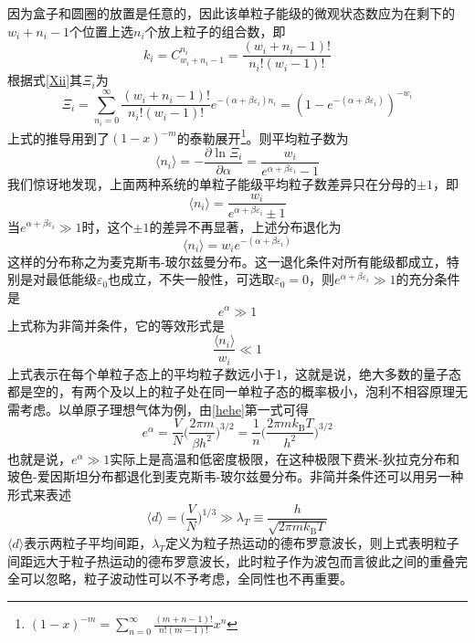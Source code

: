 \documentclass[UTF8,oneside,openany]{ctexbook}
\newcommand\aver[1]{\langle#1\rangle}
\newcommand\kb{k_{\text{B}}}
\begin{document}
因为盒子和圆圈的放置是任意的，因此该单粒子能级的微观状态数应为在剩下的$w_i+n_i-1$个位置上选$n_i$个放上粒子的组合数，即
\begin{equation}
k_i=C_{w_i+n_i-1}^{n_i}=\frac{(w_i+n_i-1)!}{n_i!(w_i-1)!}
\end{equation}
根据式\ref{Xii}其$\Xi_i$为
\begin{equation}
\Xi_i=\sum_{n_i=0}^{\infty}\frac{(w_i+n_i-1)!}{n_i!(w_i-1)!}e^{-(\alpha+\beta\varepsilon_i)n_i}=(1-e^{-(\alpha+\beta\varepsilon_i)})^{-w_i}
\end{equation}
上式的推导用到了$(1-x)^{-m}$的泰勒展开\footnote{$(1-x)^{-m}=\sum_{n=0}^{\infty}\frac{(m+n-1)!}{n!(m-1)!}x^n$}。则平均粒子数为
\begin{equation}\label{bs}
\aver{n_i}=-\frac{\partial\ln\Xi_i}{\partial\alpha}=\frac{w_i}{e^{\alpha+\beta\varepsilon_i}-1}
\end{equation}
我们惊讶地发现，上面两种系统的单粒子能级平均粒子数差异只在分母的$\pm1$，即
\begin{equation}
\aver{n_i}=\frac{w_i}{e^{\alpha+\beta\varepsilon_i}\pm1}
\end{equation}
当$e^{\alpha+\beta\varepsilon_i}\gg1$时，这个$\pm1$的差异不再显著，上述分布退化为
\begin{equation}
\aver{n_i}=w_ie^{-(\alpha+\beta\varepsilon_i)}
\end{equation}
这样的分布称之为麦克斯韦-玻尔兹曼分布。这一退化条件对所有能级都成立，特别是对最低能级$\varepsilon_0$也成立，不失一般性，可选取$\varepsilon_0=0$，则$e^{\alpha+\beta\varepsilon_i}\gg1$的充分条件是
\begin{equation}
e^{\alpha}\gg1
\end{equation}
上式称为非简并条件，它的等效形式是
\begin{equation}
\frac{\aver{n_i}}{w_i}\ll1
\end{equation}
上式表示在每个单粒子态上的平均粒子数远小于1，这就是说，绝大多数的量子态都是空的，有两个及以上的粒子处在同一单粒子态的概率极小，泡利不相容原理无需考虑。以单原子理想气体为例，由\ref{hehe}第一式可得
\begin{equation}
e^{\alpha}=\frac{V}{N}\biggl(\frac{2\pi m}{\beta h^2}\biggr)^{3/2}=\frac1n\biggl(\frac{2\pi m\kb T}{h^2}\biggr)^{3/2}
\end{equation}
也就是说，$e^{\alpha}\gg1$实际上是高温和低密度极限，在这种极限下费米-狄拉克分布和玻色-爱因斯坦分布都退化到麦克斯韦-玻尔兹曼分布。非简并条件还可以用另一种形式来表述
\begin{equation}
\aver{d}=\biggl(\frac{V}{N}\biggr)^{1/3}\gg\lambda_T\equiv\frac{h}{\sqrt{2\pi m\kb T}}
\end{equation}
$\aver{d}$表示两粒子平均间距，$\lambda_T$定义为粒子热运动的德布罗意波长，则上式表明粒子间距远大于粒子热运动的德布罗意波长，此时粒子作为波包而言彼此之间的重叠完全可以忽略，粒子波动性可以不予考虑，全同性也不再重要。
\end{document}
